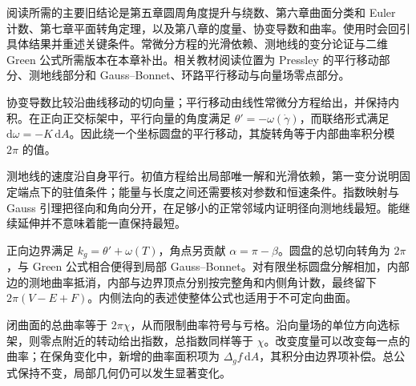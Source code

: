 \ProseParagraphBreak

阅读所需的主要旧结论是第五章圆周角度提升与绕数、第六章曲面分类和 Euler 计数、第七章平面转角定理，以及第八章的度量、协变导数和曲率。使用时会回引具体结果并重述关键条件。常微分方程的光滑依赖、测地线的变分论证与二维 Green 公式所需版本在本章补出。相关教材阅读位置为 Pressley 的平行移动部分\cite[第7.4节]{Pressley2010}、测地线部分\cite[第9.1--9.5节]{Pressley2010}和 Gauss--Bonnet、环路平行移动与向量场零点部分\cite[第13.1--13.4, 13.6--13.7节]{Pressley2010}。







\begin{chaptersummary}
	协变导数比较沿曲线移动的切向量；平行移动由线性常微分方程给出，并保持内积。在正向正交标架中，平行向量的角度满足 \(\theta'=-\omega(\dot\gamma)\)，而联络形式满足 \(\mathrm{d}\omega=-K\,\mathrm{d}A\)。因此绕一个坐标圆盘的平行移动，其旋转角等于内部曲率积分模 \(2\pi\) 的值。

	\ProseParagraphBreak

	测地线的速度沿自身平行。初值方程给出局部唯一解和光滑依赖，第一变分说明固定端点下的驻值条件；能量与长度之间还需要核对参数和恒速条件。指数映射与 Gauss 引理把径向和角向分开，在足够小的正常邻域内证明径向测地线最短。能继续延伸并不意味着能一直保持最短。

	\ProseParagraphBreak

	正向边界满足 \(k_g=\theta'+\omega(T)\)，角点另贡献 \(\alpha=\pi-\beta\)。圆盘的总切向转角为 \(2\pi\)，与 Green 公式相合便得到局部 Gauss--Bonnet。对有限坐标圆盘分解相加，内部边的测地曲率抵消，内部与边界顶点分别按完整角和内侧角计数，最终留下 \(2\pi(V-E+F)\)。内侧法向的表述使整体公式也适用于不可定向曲面。

	\ProseParagraphBreak

	闭曲面的总曲率等于 \(2\pi\chi\)，从而限制曲率符号与亏格。沿向量场的单位方向选标架，则零点附近的转动给出指数，总指数同样等于 \(\chi\)。改变度量可以改变每一点的曲率；在保角变化中，新增的曲率面积项为 \(\Delta_g f\,\mathrm{d}A\)，其积分由边界项补偿。总公式保持不变，局部几何仍可以发生显著变化。
\end{chaptersummary}

\BookExercises

